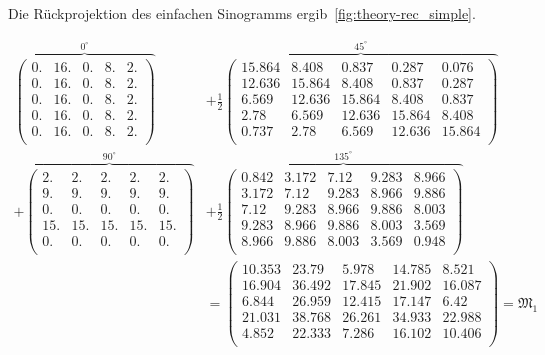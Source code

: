 \documentclass[slug=PET, room=Andreas-Schubert-Bau\,\ 424A, supervisor=Carsten\ Bittrich, coursedate=10.\ 01.\ 2020]{../../Lab_Report_LaTeX/lab_report}
\begin{document}
Die R\"uckprojektion des einfachen Sinogramms
ergib~\ref{fig:theory-rec_simple}.

{\footnotesize
\setlength{\arraycolsep}{2.5pt}

\begin{align}
  \label{eq:simplerepr}
  \overbrace{\begin{pmatrix}
      0. & 16. & 0. & 8. & 2.\\
      0. & 16. & 0. & 8. & 2.\\
      0. & 16. & 0. & 8. & 2.\\
      0. & 16. & 0. & 8. & 2.\\
      0. & 16. & 0. & 8. & 2.\\
    \end{pmatrix}}^{0^\circ} & + \frac{1}{2}\overbrace{\begin{pmatrix}
      15.864 & 8.408 & 0.837 & 0.287 & 0.076\\
      12.636 & 15.864 & 8.408 & 0.837 & 0.287\\
      6.569 & 12.636 & 15.864 & 8.408 & 0.837\\
      2.78 & 6.569 & 12.636 & 15.864 & 8.408\\
      0.737 & 2.78 & 6.569 & 12.636 & 15.864\\
    \end{pmatrix}}^{45^\circ} \nonumber \\ + \overbrace{\begin{pmatrix}
      2. & 2. & 2. & 2. & 2.\\
      9. & 9. & 9. & 9. & 9.\\
      0. & 0. & 0. & 0. & 0.\\
      15. & 15. & 15. & 15. & 15.\\
      0. & 0. & 0. & 0. & 0.\\
    \end{pmatrix}}^{90^\circ} &+ \frac{1}{2}\overbrace{\begin{pmatrix}
      0.842 & 3.172 & 7.12 & 9.283 & 8.966\\
      3.172 & 7.12 & 9.283 & 8.966 & 9.886\\
      7.12 & 9.283 & 8.966 & 9.886 & 8.003\\
      9.283 & 8.966 & 9.886 & 8.003 & 3.569\\
      8.966 & 9.886 & 8.003 & 3.569 & 0.948\\
    \end{pmatrix}}^{135^\circ}\nonumber \\
  & = \begin{pmatrix}
    10.353 & 23.79 & 5.978 & 14.785 & 8.521\\
    16.904 & 36.492 & 17.845 & 21.902 & 16.087\\
    6.844 & 26.959 & 12.415 & 17.147 & 6.42\\
    21.031 & 38.768 & 26.261 & 34.933 & 22.988\\
    4.852 & 22.333 & 7.286 & 16.102 & 10.406\\
  \end{pmatrix} = \mathfrak{M}_1
\end{align}}
\end{document}
